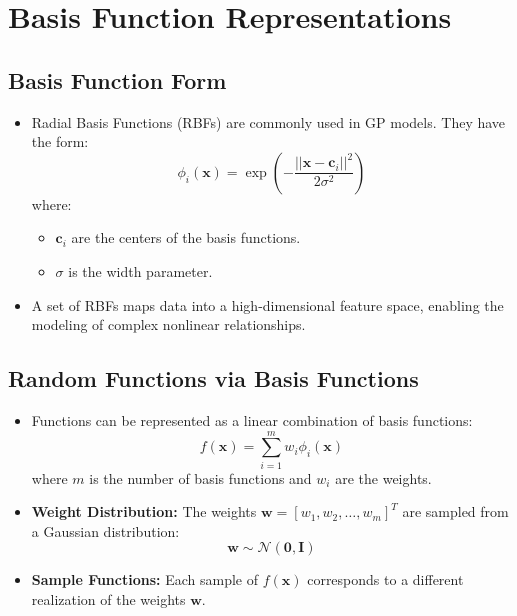 \documentclass[12pt]{article}
\begin{document}
\section{Basis Function Representations}

\subsection{Basis Function Form}
\begin{itemize}
    \item Radial Basis Functions (RBFs) are commonly used in GP models. They have the form:
    \[
    \phi_i(\mathbf{x}) = \exp\left( -\frac{||\mathbf{x} - \mathbf{c}_i||^2}{2\sigma^2} \right)
    \]
    where:
    \begin{itemize}
        \item \( \mathbf{c}_i \) are the centers of the basis functions.
        \item \( \sigma \) is the width parameter.
    \end{itemize}
    \item A set of RBFs maps data into a high-dimensional feature space, enabling the modeling of complex nonlinear relationships.
\end{itemize}

\subsection{Random Functions via Basis Functions}
\begin{itemize}
    \item Functions can be represented as a linear combination of basis functions:
    \[
    f(\mathbf{x}) = \sum_{i=1}^{m} w_i \phi_i(\mathbf{x})
    \]
    where \( m \) is the number of basis functions and \( w_i \) are the weights.
    \item \textbf{Weight Distribution:} The weights \( \mathbf{w} = [w_1, w_2, \ldots, w_m]^T \) are sampled from a Gaussian distribution:
    \[
    \mathbf{w} \sim \mathcal{N}(\mathbf{0}, \mathbf{I})
    \]
    \item \textbf{Sample Functions:} Each sample of \( f(\mathbf{x}) \) corresponds to a different realization of the weights \( \mathbf{w} \).
\end{itemize}
\end{document}
